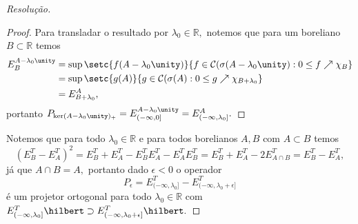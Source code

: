 \begin{proof}[Resolução]
\begin{proof}
    Para transladar o resultado por \(\lambda_0 \in \mathbb{R},\) notemos que para um boreliano \(B \subset \mathbb{R}\) temos
    \begin{align*}
      E^{A - \lambda_0\unity}_B &= \sup\setc{f(A - \lambda_0 \unity)}{f \in \mathcal{C}(\sigma(A - \lambda_0\unity) : 0 \leq f \nearrow \chi_{B}}\\
                                &= \sup\setc{g(A)}{g \in \mathcal{C}(\sigma(A) : 0\leq g \nearrow \chi_{B + \lambda_0}}\\
                                &= E^A_{B + \lambda_0},
    \end{align*}
    portanto \(P_{\ker(A - \lambda_0\unity)_+} = E^{A - \lambda_0\unity}_{(-\infty, 0]} = E^A_{(-\infty, \lambda_0]}.\)
  \end{proof}

  Notemos que para todo \(\lambda_0 \in \mathbb{R}\) e para todos borelianos \(A, B\) com \(A \subset B\) temos
  \begin{equation*}
    \left(E^T_{B} - E^T_{A}\right)^2 = E^T_{B} + E^T_{A} - E^T_{B}E^T_{A} - E^T_{A} E^T_{B} = E^T_{B} + E^T_{A} - 2E^T_{A \cap B} = E^T_{B} - E^T_{A},
  \end{equation*}
  já que \(A \cap B = A,\) portanto dado \(\epsilon < 0\) o operador
  \begin{equation*}
    P_\epsilon = E^T_{(-\infty, \lambda_0]} - E^T_{(-\infty, \lambda_0 + \epsilon]}
  \end{equation*}
  é um projetor ortogonal para todo \(\lambda_0 \in \mathbb{R}\) com \(E^T_{(-\infty, \lambda_0]}\hilbert \supset E^T_{(-\infty, \lambda_0 + \epsilon]}\hilbert.\)


\end{proof}
